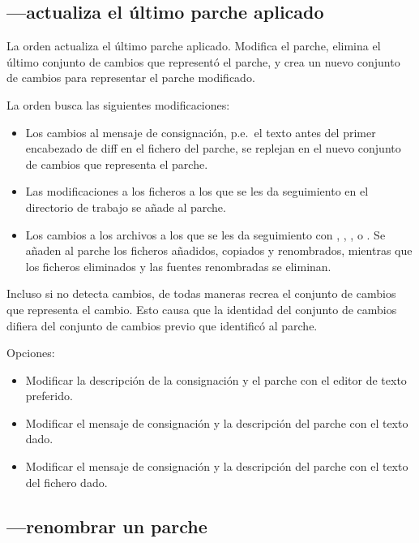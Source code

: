 \subsection{---actualiza el último parche aplicado}

La orden  actualiza el último parche aplicado.
Modifica el parche, elimina el último conjunto de cambios que
representó el parche, y crea un nuevo conjunto de cambios para
representar el parche modificado.

La orden  busca las siguientes modificaciones:
\begin{itemize}
\item Los cambios al mensaje de consignación, p.e.~el texto antes del
  primer encabezado de diff en el fichero del parche, se replejan en
  el nuevo conjunto de cambios que representa el parche.
\item Las modificaciones a los ficheros a los que se les da
  seguimiento en el directorio de trabajo se añade al parche.
\item Los cambios a los archivos a los que se les da seguimiento con
  , , , o .  Se
  añaden al parche los ficheros añadidos, copiados y renombrados,
  mientras que los ficheros eliminados y las fuentes renombradas se
  eliminan.
\end{itemize}

Incluso si  no detecta cambios, de todas maneras
recrea el conjunto de cambios que representa el cambio.  Esto causa
que la identidad del conjunto de cambios difiera del conjunto de
cambios previo que identificó al parche.

Opciones:
\begin{itemize}
\item[\hgxopt{mq}{qrefresh}{-e}] Modificar la descripción de la
  consignación y el parche con el editor de texto preferido.
\item[\hgxopt{mq}{qrefresh}{-m}] Modificar el mensaje de consignación
  y la descripción del parche con el texto dado.
\item[\hgxopt{mq}{qrefresh}{-l}] Modificar el mensaje de consignación
  y la descripción del parche con el texto del fichero dado.
\end{itemize}

\subsection{---renombrar un parche}

